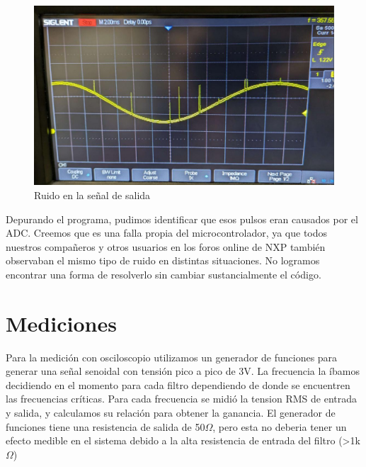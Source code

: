 \documentclass[11pt,a4paper]{report}
\begin{document}
\begin{figure}[h]
    \centering
    \includegraphics[scale=0.4]{figs/ruido.jpg}
    \caption{Ruido en la señal de salida}
\end{figure}

Depurando el programa, pudimos identificar que esos pulsos eran causados por el ADC. Creemos que es una falla propia del microcontrolador, ya que todos nuestros compañeros y otros usuarios en los foros online de NXP también observaban el mismo tipo de ruido en distintas situaciones. No logramos encontrar una forma de resolverlo sin cambiar sustancialmente el código.

\chapter{Mediciones}

Para la medición con osciloscopio utilizamos un generador de funciones para generar una señal senoidal con tensión pico a pico de 3V. La frecuencia la íbamos decidiendo en el momento para cada filtro dependiendo de donde se encuentren las frecuencias críticas. Para cada frecuencia se midió la tension RMS de entrada y salida, y calculamos su relación para obtener la ganancia.
El generador de funciones tiene una resistencia de salida de 50$\Omega$, pero esta no deberia tener un efecto medible en el sistema debido a la alta resistencia de entrada del filtro (\textgreater 1k$\Omega$)
\end{document}

